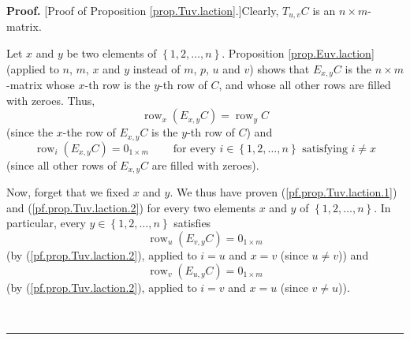 \documentclass[numbers=enddot,12pt,final,onecolumn,notitlepage]{scrartcl}%
\theoremstyle{definition}
\newenvironment{proof}[1][Proof]{\noindent\textbf{#1.} }{\ \rule{0.5em}{0.5em}}
\begin{document}
\begin{proof}
[Proof of Proposition \ref{prop.Tuv.laction}.]Clearly, $T_{u,v}C$ is an
$n\times m$-matrix.

Let $x$ and $y$ be two elements of $\left\{  1,2,\ldots,n\right\}  $.
Proposition \ref{prop.Euv.laction} (applied to $n$, $m$, $x$ and $y$ instead
of $m$, $p$, $u$ and $v$) shows that $E_{x,y}C$ is the $n\times m$-matrix
whose $x$-th row is the $y$-th row of $C$, and whose all other rows are filled
with zeroes. Thus,%
\begin{equation}
\operatorname*{row}\nolimits_{x}\left(  E_{x,y}C\right)  =\operatorname*{row}%
\nolimits_{y}C \label{pf.prop.Tuv.laction.1}%
\end{equation}
(since the $x$-the row of $E_{x,y}C$ is the $y$-th row of $C$) and%
\begin{equation}
\operatorname*{row}\nolimits_{i}\left(  E_{x,y}C\right)  =0_{1\times
m}\ \ \ \ \ \ \ \ \ \ \text{for every }i\in\left\{  1,2,\ldots,n\right\}
\text{ satisfying }i\neq x \label{pf.prop.Tuv.laction.2}%
\end{equation}
(since all other rows of $E_{x,y}C$ are filled with zeroes).

Now, forget that we fixed $x$ and $y$. We thus have proven
(\ref{pf.prop.Tuv.laction.1}) and (\ref{pf.prop.Tuv.laction.2}) for every two
elements $x$ and $y$ of $\left\{  1,2,\ldots,n\right\}  $. In particular,
every $y\in\left\{  1,2,\ldots,n\right\}  $ satisfies%
\begin{equation}
\operatorname*{row}\nolimits_{u}\left(  E_{v,y}C\right)  =0_{1\times m}
\label{pf.prop.Tuv.laction.2a}%
\end{equation}
(by (\ref{pf.prop.Tuv.laction.2}), applied to $i=u$ and $x=v$ (since $u\neq
v$)) and%
\begin{equation}
\operatorname*{row}\nolimits_{v}\left(  E_{u,y}C\right)  =0_{1\times m}
\label{pf.prop.Tuv.laction.2b}%
\end{equation}
(by (\ref{pf.prop.Tuv.laction.2}), applied to $i=v$ and $x=u$ (since $v\neq u$)).


\end{proof}
\end{document}
